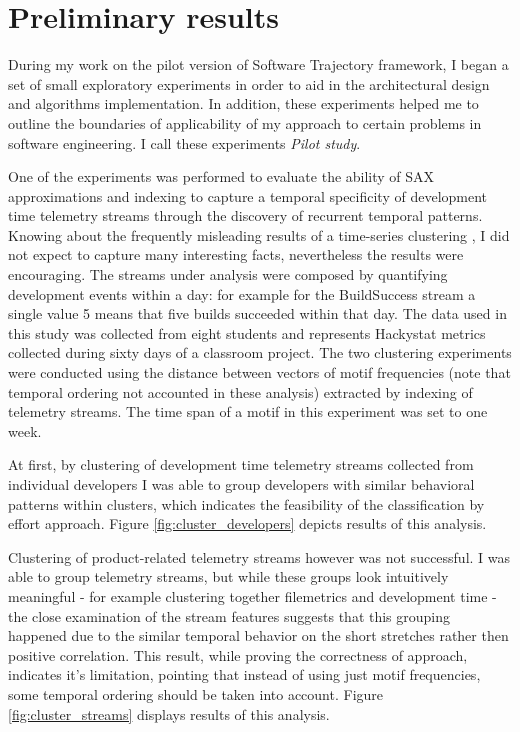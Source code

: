 \documentclass{sig-alternate}
\begin{document}
\section{Preliminary results}
During my work on the pilot version of Software Trajectory framework, I began a set of small exploratory experiments in order to aid in the architectural design and algorithms implementation. In addition, these experiments helped me to outline the boundaries of applicability of my approach to certain problems in software engineering. I call these experiments \textit{Pilot study}.

One of the experiments was performed to evaluate the ability of SAX approximations and indexing to capture a temporal specificity of development time telemetry streams through the discovery of recurrent temporal patterns. Knowing about the frequently misleading results of a time-series clustering \cite{citeulike:227029}, I did not expect to capture many interesting facts, nevertheless the results were encouraging. The streams under analysis were composed by quantifying development events within a day: for example for the BuildSuccess stream a single value 5 means that five builds succeeded within that day. The data used in this study was collected from eight students and represents Hackystat metrics collected during sixty days of a classroom project. The two clustering experiments were conducted using the distance between vectors of motif frequencies (note that temporal ordering not accounted in these analysis) extracted by indexing of telemetry streams. The time span of a motif in this experiment was set to one week.

At first, by clustering of development time telemetry streams collected from individual developers I was able to group developers with similar behavioral patterns within clusters, which indicates the feasibility of the classification by effort approach. Figure \ref{fig:cluster_developers} depicts results of this analysis.

Clustering of product-related telemetry streams however was not successful. I was able to group telemetry streams, but while these groups look intuitively meaningful - for example clustering together filemetrics and development time - the close examination of the stream features suggests that this grouping happened due to the similar temporal behavior on the short stretches rather then positive correlation. This result, while proving the correctness of approach, indicates it's limitation, pointing that instead of using just motif frequencies, some temporal ordering should be taken into account. Figure \ref{fig:cluster_streams} displays results of this analysis.
\end{document}
